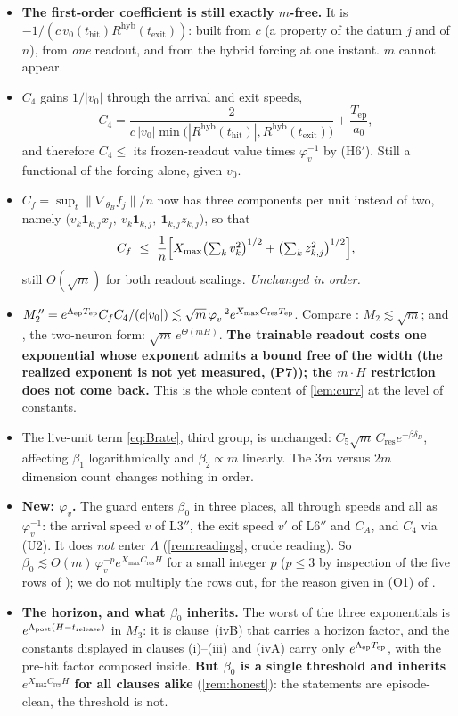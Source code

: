 \documentclass[11pt]{article}
\theoremstyle{remark}
\newcommand{\thit}{t_{\mathrm{hit}}}
\newcommand{\texit}{t_{\mathrm{exit}}}
\newcommand{\trel}{t_{\mathrm{release}}}
\newcommand{\Tep}{T_{\mathrm{ep}}}
\newcommand{\hyb}{\mathrm{hyb}}
\newcommand{\Cres}{C_{\mathrm{res}}}
\newcommand{\Xmax}{X_{\max}}
\newcommand{\hyplabel}[1]{\textup{(#1)}}
\begin{document}
\begin{itemize}
\item[(U1)] \textbf{The first-order coefficient is still exactly $m$-free.} It
is $-1/(c\,v_0(\thit)R^{\hyb}(\texit))$: built from $c$ (a property of the datum
$j$ and of $n$), from \emph{one} readout, and from the hybrid forcing at one
instant. $m$ cannot appear.
\item[(U2)] $C_4$ gains $1/|v_0|$ through the arrival and exit speeds,
\[C_4=\frac{2}{c\,|v_0|\min\bigl(|R^{\hyb}(\thit)|,R^{\hyb}(\texit)\bigr)}+\frac{\Tep}{a_0},\]
and therefore $C_4\le$ its frozen-readout value times $\varphi_v^{-1}$ by
\hyplabel{H6$'$}. Still a functional of the forcing alone, given $v_0$.
\item[(U3)] $C_f=\sup_t\|\nabla_{\theta_B}f_j\|/n$ now has three components per
unit instead of two, namely
$\bigl(v_k\mathbf1_{k,j}x_j,\ v_k\mathbf1_{k,j},\ \mathbf1_{k,j}z_{k,j}\bigr)$,
so that
\[
C_f\ \le\ \frac1n\Bigl[\Xmax\bigl(\textstyle\sum_kv_k^2\bigr)^{1/2}
+\bigl(\textstyle\sum_kz_{k,j}^2\bigr)^{1/2}\Bigr],
\]
still $O(\sqrt m)$ for both readout scalings. \emph{Unchanged in order.}
\item[(U4)] $M_2^{\,\prime\prime}=e^{\Lambda_{\rm ep}\Tep}C_fC_4/(c|v_0|)
\lesssim\sqrt m\,\varphi_v^{-2}e^{\Xmax\Cres\Tep}$. Compare \cite{paper}:
$M_2\lesssim\sqrt m$; and \cite[L2]{paper}, the two-neuron form:
$\sqrt m\,e^{\Theta(mH)}$. \textbf{The trainable readout costs one exponential
whose exponent admits a bound free of the width (the realized exponent is not yet measured, (P7)); the $m\cdot H$ restriction does not come
back.} This is the whole content of \cref{lem:curv} at the level of constants.
\item[(U5)] The live-unit term \eqref{eq:Brate}, third group, is unchanged:
$C_5\sqrt m\,\Cres e^{-\beta\delta_B}$, affecting $\beta_1$ logarithmically and
$\beta_2\propto m$ linearly. The $3m$ versus $2m$ dimension count changes
nothing in order.
\item[(U6)] \textbf{New: $\varphi_v$.} The guard enters $\beta_0$ in three
places, all through speeds and all as $\varphi_v^{-1}$: the arrival speed $v$ of
L3$''$, the exit speed $v'$ of L6$''$ and $C_A$, and $C_4$ via (U2). It does
\emph{not} enter $\Lambda$ (\cref{rem:readings}, crude reading). So
$\beta_0\lesssim O(m)\,\varphi_v^{-p}e^{\Xmax\Cres H}$ for a small integer $p$
($p\le3$ by inspection of the five rows of \cite[Tab.~5]{paper}); we do not
multiply the rows out, for the reason given in (O1) of \cite{paper}.
\item[(U7)] \textbf{The horizon, and what $\beta_0$ inherits.} The worst of the
three exponentials is $e^{\Lambda_{\rm post}(H-\trel)}$ in $M_3$: it is
clause~(ivB) that carries a horizon factor, and the constants displayed in
clauses (i)--(iii) and (ivA) carry only $e^{\Lambda_{\rm ep}\Tep}$, with the
pre-hit factor composed inside. \textbf{But $\beta_0$ is a single threshold and
inherits $e^{\Xmax\Cres H}$ for all clauses alike} (\cref{rem:honest}): the
statements are episode-clean, the threshold is not.
\end{itemize}
\end{document}
